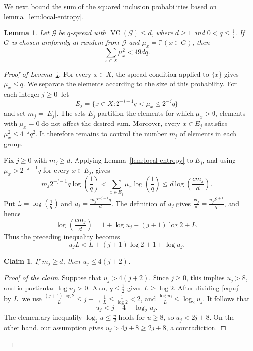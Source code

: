 \documentclass[11pt]{article}
\newtheorem{lemma}[theorem]{Lemma}
\newtheorem{claim}[theorem]{Claim}
\theoremstyle{definition}
\newenvironment{poc}{\begin{proof}[Proof of the claim]\renewcommand*{\qedsymbol}{\(\blacksquare\)}}{\end{proof}}
\newcommand*{\abs}[1]{\lvert#1\rvert}
\newcommand{\cG}{\mathcal{G}}
\newcommand{\VC}{\operatorname{VC}}
\begin{document}
We next bound the sum of the squared inclusion probabilities based on lemma~\ref{lem:local-entropy}.

\begin{lemma}\label{lem:square-sum}
Let \(\cG\) be \(q\)-spread with \(\VC(\cG)\le d\), where \(d\ge 1\) and \(0<q\le\frac{1}{2}\). If \(G\) is chosen uniformly at random from \(\cG\) and \(\mu_{x}=\mathbb{P}(x\in G)\), then
\[
\sum_{x\in X}\mu_{x}^{2}<49dq.
\]
\end{lemma}

\begin{proof}[Proof of Lemma~\ref{lem:square-sum}]
For every \(x\in X\), the spread condition applied to \(\{x\}\) gives \(\mu_{x}\le q\). We separate the elements according to the size of this probability. For each integer \(j\ge 0\), let
\[
E_{j}=\{x\in X:2^{-j-1}q<\mu_{x}\le 2^{-j}q\}
\]
and set \(m_{j}=\abs{E_{j}}\). The sets \(E_{j}\) partition the elements for which \(\mu_{x}>0\), elements with \(\mu_{x}=0\) do not affect the desired sum. Moreover, every \(x\in E_{j}\) satisfies \(\mu_{x}^{2}\le 4^{-j}q^{2}\). It therefore remains to control the number \(m_{j}\) of elements in each group.

Fix \(j\ge 0\) with \(m_{j}\ge d\). Applying Lemma~\ref{lem:local-entropy} to \(E_{j}\), and using \(\mu_{x}>2^{-j-1}q\) for every \(x\in E_{j}\), gives
\[
m_{j}2^{-j-1}q\log\left(\frac{1}{q}\right)
<\sum_{x\in E_{j}}\mu_{x}\log\left(\frac{1}{q}\right)
\le d\log\left(\frac{em_{j}}{d}\right).
\]
Put \(L=\log\left(\frac{1}{q}\right)\) and \(u_{j}=\frac{m_{j}2^{-j-1}q}{d}\). The definition of \(u_{j}\) gives \(\frac{m_{j}}{d}=\frac{u_{j}2^{j+1}}{q}\), and hence
\[
\log\left(\frac{em_{j}}{d}\right)=1+\log u_{j}+(j+1)\log 2+L.
\]
Thus the preceding inequality becomes
\begin{equation}\label{eq:uj}
u_{j}L<L+(j+1)\log 2+1+\log u_{j}.
\end{equation}

\begin{claim}\label{claim:uj}
If \(m_{j}\ge d\), then \(u_{j}\le 4(j+2)\).
\end{claim}

\begin{poc}
Suppose that \(u_{j}>4(j+2)\). Since \(j\ge 0\), this implies \(u_{j}>8\), and in particular \(\log u_{j}>0\). Also, \(q\le\frac{1}{2}\) gives \(L\ge\log 2\). After dividing \eqref{eq:uj} by \(L\), we use \(\frac{(j+1)\log 2}{L}\le j+1\), \(\frac{1}{L}\le\frac{1}{\log 2}<2\), and \(\frac{\log u_{j}}{L}\le\log_{2}u_{j}\). It follows that
\[
u_{j}<j+4+\log_{2}u_{j}.
\]
The elementary inequality \(\log_{2}u\le\frac{u}{2}\) holds for \(u\ge 8\), so \(u_{j}<2j+8\). On the other hand, our assumption gives \(u_{j}>4j+8\ge 2j+8\), a contradiction.
\end{poc}


\end{proof}
\end{document}
